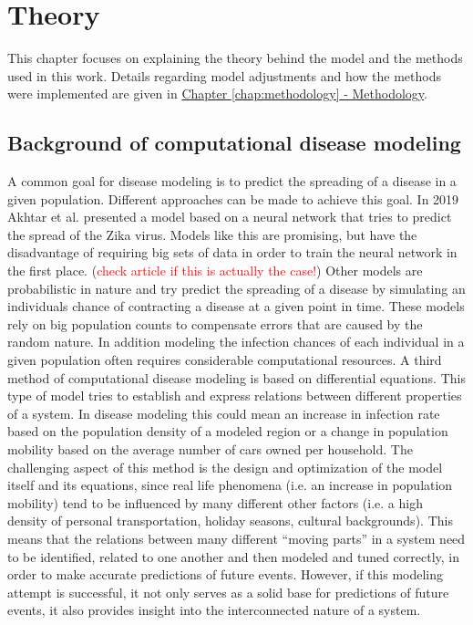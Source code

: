 
\chapter{Theory} %
This chapter focuses on explaining the theory behind the model and the methods used in this work.
Details regarding model adjustments and how the methods were implemented are given in
\hyperref[chap:methodology]{Chapter \ref*{chap:methodology} - Methodology}.

\label{chap:theory} %


\section{Background of computational disease modeling}
A common goal for disease modeling is to predict the spreading of a disease in a given population. Different approaches can be made to
achieve this goal. In 2019 Akhtar et al. presented a model based on a neural network that tries to predict the spread of the Zika virus\cite{note}.
Models like this are promising, but have the disadvantage of requiring big sets of data in order to train the neural network in the first place.
(\textcolor{red}{check article if this is actually the case!}) %
Other models are probabilistic in nature and try predict the spreading of a disease by simulating an individuals chance of contracting a
disease at a given point in time\cite{??}. These models rely on big population counts to compensate errors that are caused by the random nature.
In addition modeling the infection chances of each individual in a given population often requires considerable computational resources\cite{??}.
A third method of computational disease modeling is based on differential equations. This type of model tries to establish and express relations between different
properties of a system. In disease modeling this could mean an increase in infection rate based on the population density of a modeled region or a
change in population mobility based on the average number of cars owned per household\cite{??}. The challenging aspect of this method is the design and
optimization of the model itself and its equations, since real life phenomena (i.e. an increase in population mobility) tend to be influenced by many
different other factors (i.e. a high density of personal transportation, holiday seasons, cultural backgrounds). This means that the relations between many
different ``moving parts'' in a system need to be identified, related to one another and then modeled and tuned correctly, in order to make accurate predictions
of future events. However, if this modeling attempt is successful, it not only serves as a solid base for predictions of future events, it also provides insight
into the interconnected nature of a system.


